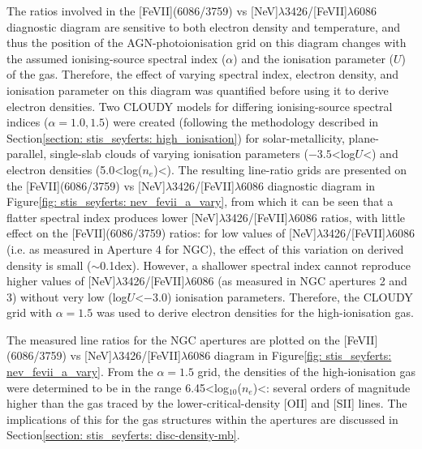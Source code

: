 The ratios involved in the [FeVII](6086/3759) vs [NeV]$\lambda$3426/[FeVII]$\lambda$6086 diagnostic diagram are sensitive to both electron density and temperature, and thus the position of the AGN-photoionisation grid on this diagram changes with the assumed ionising-source spectral index ($\alpha$) and the ionisation parameter ($U$) of the gas. Therefore, the effect of varying spectral index, electron density, and ionisation parameter on this diagram was quantified before using it to derive electron densities. Two \textsc{CLOUDY} models for differing ionising-source spectral indices ($\alpha=1.0, 1.5$) were created (following the methodology described in Section\;\ref{section: stis_seyferts: high_ionisation}) for solar-metallicity, plane-parallel, single-slab clouds of varying ionisation parameters ($-3.5$\;\textless\;log\;$U$\;\textless{}) and electron densities (5.0\;\textless\;log($n_e$\;[cm$^{-3}$])\;\textless{}). The resulting line-ratio grids are presented on the [FeVII](6086/3759) vs [NeV]$\lambda$3426/[FeVII]$\lambda$6086 diagnostic diagram in Figure\;\ref{fig: stis_seyferts: nev_fevii_a_vary}, from which it can be seen that a flatter spectral index produces lower [NeV]$\lambda$3426/[FeVII]$\lambda$6086 ratios, with little effect on the [FeVII](6086/3759) ratios: for low values of [NeV]$\lambda$3426/[FeVII]$\lambda$6086 (i.e. as measured in Aperture 4 for NGC), the effect of this variation on derived density is small ($\sim$0.1\;dex). However, a shallower spectral index cannot reproduce higher values of [NeV]$\lambda$3426/[FeVII]$\lambda$6086 (as measured in NGC apertures 2 and 3) without very low (log\;$U$\;\textless\;$-3.0$) ionisation parameters. Therefore, the \textsc{CLOUDY} grid with $\alpha=1.5$ was used to derive electron densities for the high-ionisation gas.

The measured line ratios for the NGC apertures are plotted on the [FeVII](6086/3759) vs [NeV]$\lambda$3426/[FeVII]$\lambda$6086 diagram in Figure\;\ref{fig: stis_seyferts: nev_fevii_a_vary}. From the $\alpha=1.5$ grid, the densities of the high-ionisation gas were determined to be in the range 6.45\;\textless\;log$_{10}$($n_e$\;[cm$^{-3}$])\;\textless{}: several orders of magnitude higher than the gas traced by the lower-critical-density [OII] and [SII] lines. The implications of this for the gas structures within the apertures are discussed in Section\;\ref{section: stis_seyferts: disc-density-mb}. 

\vspace*{\fill}

